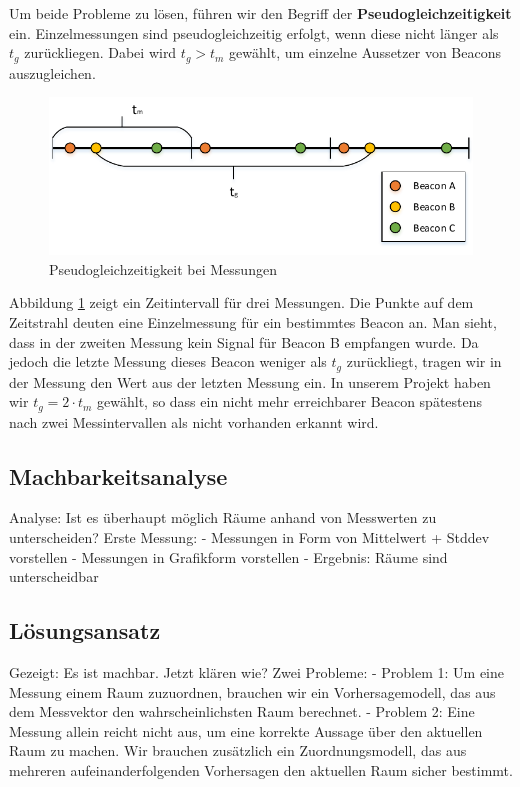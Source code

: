 Um beide Probleme zu lösen, führen wir den Begriff der \textbf{Pseudogleichzeitigkeit} ein.
Einzelmessungen sind pseudogleichzeitig erfolgt, wenn diese nicht länger als 
$t_g$ zurückliegen. Dabei wird $t_g > t_m$ gewählt, um einzelne Aussetzer von Beacons
auszugleichen.

\begin{figure}[tbh]
\centering
\includegraphics[width=1.0\linewidth]{Bilder/Lok-Messung}
\caption{Pseudogleichzeitigkeit bei Messungen}
\label{fig:Lok-Messung}
\end{figure}

Abbildung \ref{fig:Lok-Messung} zeigt ein Zeitintervall für drei Messungen. Die
Punkte auf dem Zeitstrahl deuten eine Einzelmessung für ein bestimmtes Beacon
an.
Man sieht, dass in der zweiten Messung kein Signal für Beacon B empfangen wurde.
Da jedoch die letzte Messung dieses Beacon weniger als $t_g$ zurückliegt, tragen
wir in der Messung den Wert aus der letzten Messung ein.
In unserem Projekt haben wir $t_g = 2 \cdot t_m$ gewählt, so dass ein nicht mehr
erreichbarer Beacon spätestens nach zwei Messintervallen als nicht vorhanden
erkannt wird.

\subsection{Machbarkeitsanalyse}

Analyse: Ist es überhaupt möglich Räume anhand von Messwerten zu unterscheiden?
Erste Messung:
- Messungen in Form von Mittelwert + Stddev vorstellen
- Messungen in Grafikform vorstellen
- Ergebnis: Räume sind unterscheidbar

\subsection{Lösungsansatz}

Gezeigt: Es ist machbar. Jetzt klären wie?
Zwei Probleme:
- Problem 1: Um eine Messung einem Raum zuzuordnen, brauchen wir ein Vorhersagemodell,
  das aus dem Messvektor den wahrscheinlichsten Raum berechnet.
- Problem 2: Eine Messung allein reicht nicht aus, um eine korrekte Aussage über
  den aktuellen Raum zu machen. Wir brauchen zusätzlich ein Zuordnungsmodell,
  das aus mehreren aufeinanderfolgenden Vorhersagen den aktuellen Raum sicher
  bestimmt.
  
